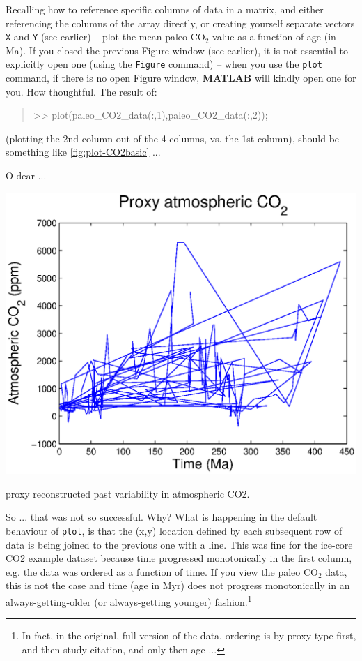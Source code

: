 \documentclass{tufte-book} %
\newenvironment{docspec}{\begin{quotation}\ttfamily\parskip0pt\parindent0pt\ignorespaces}{\end{quotation}}
\begin{document}
Recalling how to reference specific columns of data in a matrix, and either referencing the columns of the array directly, or creating yourself separate vectors \texttt{X} and \texttt{Y} (see earlier) -- plot the mean paleo CO\(_{2}\) value as a function of age (in Ma). If you  closed the previous \textsf{Figure} window (see earlier), it is not essential to explicitly open one (using the \texttt{Figure} command) -- when you use the \texttt{plot} command, if there is no open \textsf{Figure} window, \textbf{MATLAB} will kindly open one for you. How thoughtful. The result of:

\begin{docspec}
>> plot(paleo\_CO2\_data(:,1),paleo\_CO2\_data(:,2));
\end{docspec}

\noindent (plotting the 2nd column out of the 4 columns, vs. the 1st column), should be something like \ref{fig:plot-CO2basic} ...

O dear ...

\begin{marginfigure}[-2.0in]
\includegraphics[width=\linewidth]{plot-CO2basic.eps}
\caption{proxy reconstructed past variability in atmospheric CO2.}
\label{fig:plot-CO2basic}
\end{marginfigure}

So ... that was not so successful. Why? What is happening in the default behaviour of \texttt{plot}, is that the (x,y) location defined by each subsequent row of data is being joined to the previous one with a line. This was fine for the ice-core CO2 example dataset because time progressed monotonically  in the first column, e.g. the data was ordered as a function of time. If you view the paleo CO\(_{2}\) data, this is not the case and time (age in Myr) does not progress monotonically in an always-getting-older (or always-getting younger) fashion.\footnote{In fact, in the original, full version of the data, ordering is by proxy type first, and then study citation, and only then age ...}
\end{document}
